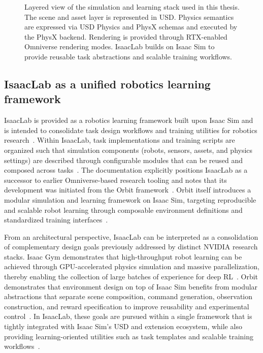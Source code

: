 \begin{figure}[ht!]
\centering
{}
\caption[Layered view of Isaac Sim and IsaacLab]{Layered view of the simulation and learning stack used in this thesis. The scene and asset layer is represented in \ac{USD}. Physics semantics are expressed via \ac{USD} Physics and PhysX schemas and executed by the PhysX backend. Rendering is provided through RTX-enabled Omniverse rendering modes. IsaacLab builds on Isaac Sim to provide reusable task abstractions and scalable training workflows.}\label{fig:isaac_stack_overview}
\end{figure}

\subsection{IsaacLab as a unified robotics learning framework}
IsaacLab is provided as a robotics learning framework built upon Isaac Sim and is intended to consolidate task design workflows and training utilities for robotics research~\cite{isaaclab_overview_doc,isaac_sim_510_overview}.
Within IsaacLab, task implementations and training scripts are organized such that simulation components (robots, sensors, assets, and physics settings) are described through configurable modules that can be reused and composed across tasks~\cite{isaaclab_overview_doc}.
The documentation explicitly positions IsaacLab as a successor to earlier Omniverse-based research tooling and notes that its development was initiated from the Orbit framework~\cite{isaaclab_overview_doc}.
Orbit itself introduces a modular simulation and learning framework on Isaac Sim, targeting reproducible and scalable robot learning through composable environment definitions and standardized training interfaces~\cite{Mittal2023Orbit}.

From an architectural perspective, IsaacLab can be interpreted as a consolidation of complementary design goals previously addressed by distinct NVIDIA research stacks.
Isaac Gym demonstrates that high-throughput robot learning can be achieved through \ac{GPU}-accelerated physics simulation and massive parallelization, thereby enabling the collection of large batches of experience for deep \ac{RL}~\cite{Makoviychuk2021IsaacGym}.
Orbit demonstrates that environment design on top of Isaac Sim benefits from modular abstractions that separate scene composition, command generation, observation construction, and reward specification to improve reusability and experimental control~\cite{Mittal2023Orbit}.
In IsaacLab, these goals are pursued within a single framework that is tightly integrated with Isaac Sim’s \ac{USD} and extension ecosystem, while also providing learning-oriented utilities such as task templates and scalable training workflows~\cite{isaaclab_overview_doc}. %

